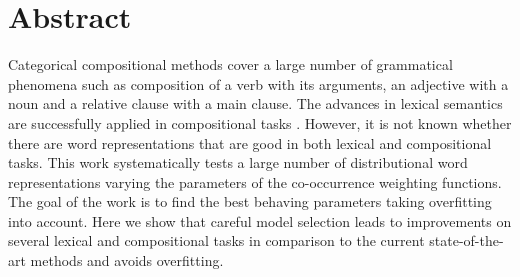 \chapter*{Abstract}
\label{cha:abstract}

Categorical compositional methods \cite{DBLP:journals/corr/abs-1003-4394} cover a large number of grammatical phenomena such as composition of a verb with its arguments, an adjective with a noun and a relative clause with a main clause. The advances in lexical semantics \cite{mikolov2013efficient,baroni-dinu-kruszewski:2014:P14-1,TACL570} are successfully applied in compositional tasks \cite{milajevs-EtAl:2014:EMNLP2014}. However, it is not known whether there are word representations that are good in both lexical and compositional tasks.
%
This work systematically tests a large number of distributional word representations varying the parameters of the co-occurrence weighting functions.
The goal of the work is to find the best behaving parameters taking overfitting \cite{lapesa2014large} into account.
%
Here we show that careful model selection leads to improvements on several lexical and compositional tasks in comparison to the current state-of-the-art methods and avoids overfitting.

